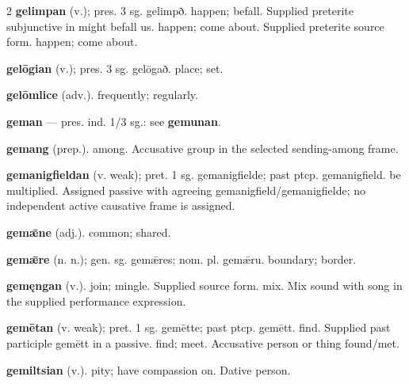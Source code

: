\begin{multicols*}{2}
\textbf{gelimpan} (v.); pres. 3 sg. gelimpð. happen; befall. Supplied preterite subjunctive in might befall us. happen; come about. Supplied preterite source form. happen; come about.\par
\textbf{gelōgian} (v.); pres. 3 sg. gelōgað. place; set.\par
\textbf{gelōmlice} (adv.). frequently; regularly.\par
\textbf{geman} — pres. ind. 1/3 sg.: see \textbf{gemunan}.\par
\textbf{gemang} (prep.). among. Accusative group in the selected sending-among frame.\par
\textbf{gemanigfieldan} (v. weak); pret. 1 sg. gemanigfielde; past ptcp. gemanigfield. be multiplied. Assigned passive with agreeing gemanigfield/gemanigfielde; no independent active causative frame is assigned.\par
\textbf{gemǣne} (adj.). common; shared.\par
\textbf{gemǣre} (n. n.); gen. sg. gemǣres; nom. pl. gemǣru. boundary; border.\par
\textbf{gemęngan} (v.). join; mingle. Supplied source form. mix. Mix sound with song in the supplied performance expression.\par
\textbf{gemētan} (v. weak); pret. 1 sg. gemētte; past ptcp. gemētt. find. Supplied past participle gemētt in a passive. find; meet. Accusative person or thing found/met.\par
\textbf{gemiltsian} (v.). pity; have compassion on. Dative person.\par

\end{multicols*}
